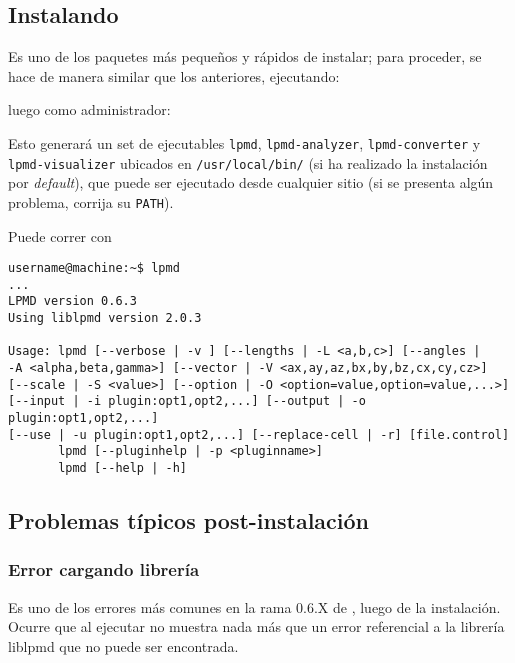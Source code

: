 \subsection{Instalando {\lpmd}}

Es uno de los paquetes m\'as peque\~nos y r\'apidos de instalar; para proceder, se hace de manera similar que los anteriores, ejecutando:


luego como administrador:


Esto generar\'a un set de ejecutables \verb|lpmd|, \verb|lpmd-analyzer|, \verb|lpmd-converter| y \verb|lpmd-visualizer| ubicados en \verb|/usr/local/bin/| (si ha realizado la instalaci\'on por \textit{default}), que puede ser ejecutado desde cualquier sitio (si se presenta alg\'un problema, corrija su \verb|PATH|).

Puede correr {\lpmd} con

\begin{verbatim}
username@machine:~$ lpmd
...
LPMD version 0.6.3
Using liblpmd version 2.0.3

Usage: lpmd [--verbose | -v ] [--lengths | -L <a,b,c>] [--angles | 
-A <alpha,beta,gamma>] [--vector | -V <ax,ay,az,bx,by,bz,cx,cy,cz>] 
[--scale | -S <value>] [--option | -O <option=value,option=value,...>] 
[--input | -i plugin:opt1,opt2,...] [--output | -o plugin:opt1,opt2,...] 
[--use | -u plugin:opt1,opt2,...] [--replace-cell | -r] [file.control]
       lpmd [--pluginhelp | -p <pluginname>]
       lpmd [--help | -h]
\end{verbatim}

\subsection{Problemas t\'ipicos post-instalaci\'on}

\subsubsection{Error cargando librer\'ia}

Es uno de los errores m\'as comunes en la rama 0.6.X de {\lpmd}, luego de la instalaci\'on. Ocurre que al ejecutar {\lpmd} no muestra nada m\'as que un error referencial a la librer\'ia liblpmd que no puede ser encontrada.

